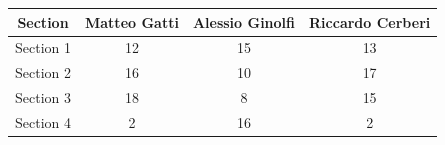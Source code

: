 \begin{center}
    \begin{tabular}{ cccc } 
    \toprule
        \textbf{Section} & \textbf{Matteo Gatti} & \textbf{Alessio Ginolfi} & \textbf{Riccardo Cerberi} \\
    \midrule
        Section 1 & 12 & 15 & 13 \\ 
        Section 2 & 16 & 10 &  17 \\
        Section 3 & 18 & 8 &  15 \\
        Section 4 & 2 & 16 & 2 \\ 
    \bottomrule
    \end{tabular}
\end{center}

\newpage